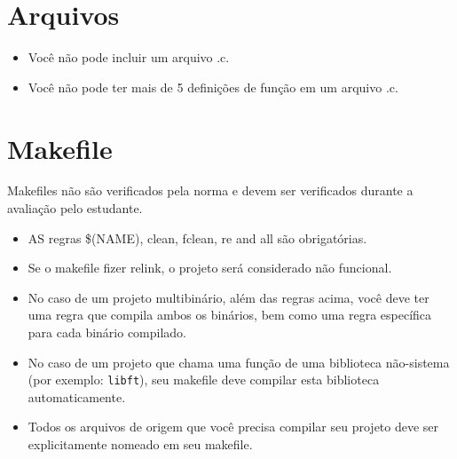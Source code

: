 \documentclass{42-pt}
\begin{document}
    \section{Arquivos}

        \begin{itemize}

            \item Você não pode incluir um arquivo .c.

            \item Você não pode ter mais de 5 definições de função em um arquivo .c.

        \end{itemize}
        \newpage


    \section{Makefile}

            Makefiles não são verificados pela norma e devem ser verificados durante a avaliação pelo estudante.
            \begin{itemize}

                \item AS regras \$(NAME), clean, fclean, re and all
                  são obrigatórias.

                \item Se o makefile fizer relink, o projeto será considerado
                  não funcional.

                \item No caso de um projeto multibinário, além das
                  regras acima, você deve ter uma regra que compila
                  ambos os binários, bem como uma regra específica para cada
                  binário compilado.

                \item No caso de um projeto que chama uma função de uma biblioteca não-sistema
                  (por exemplo: \texttt{libft}), seu makefile deve compilar
                  esta biblioteca automaticamente.

                \item Todos os arquivos de origem que você precisa compilar seu projeto deve
                    ser explicitamente nomeado em seu makefile.

            \end{itemize}
\end{document}
